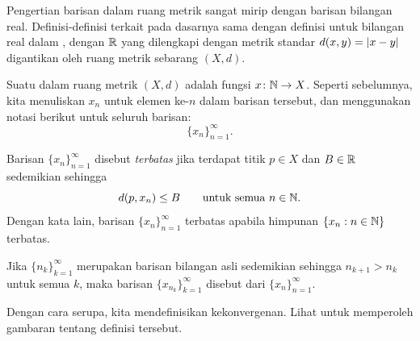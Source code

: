 Pengertian barisan dalam ruang metrik sangat mirip dengan barisan
bilangan real.
Definisi-definisi terkait pada dasarnya sama dengan definisi untuk bilangan real
dalam , dengan ${\mathbb{R}}$ yang dilengkapi
dengan metrik standar $d(x,y)=\lvert {x-y} \rvert$ digantikan
oleh ruang metrik sebarang $(X,d)$.


\begin{defn}
Suatu \emph{} dalam ruang metrik $(X,d)$ adalah fungsi
$x \colon {\mathbb{N}} \to X$.  Seperti sebelumnya, kita menuliskan $x_n$ untuk elemen ke-$n$ dalam
barisan tersebut, dan menggunakan notasi berikut untuk seluruh barisan:
\begin{equation*}
\{ x_n \}_{n=1}^\infty .
\end{equation*}

Barisan $\{ x_n \}_{n=1}^\infty$ disebut \emph{terbatas} jika
terdapat titik $p \in X$ dan $B \in {\mathbb{R}}$ sedemikian sehingga
\begin{equation*}
d(p,x_n) \leq B \qquad \text{untuk semua } n \in {\mathbb{N}}.
\end{equation*}
Dengan kata lain, barisan $\{x_n\}_{n=1}^\infty$ terbatas apabila
himpunan $\{ x_n : n \in {\mathbb{N}} \}$
terbatas.

Jika $\{ n_k \}_{k=1}^\infty$ merupakan barisan bilangan asli
sedemikian sehingga $n_{k+1} > n_k$ untuk semua $k$, maka
barisan $\{ x_{n_k} \}_{k=1}^\infty$
disebut
\emph{} dari $\{x_n \}_{n=1}^\infty$.
\end{defn}

Dengan cara serupa, kita mendefinisikan kekonvergenan.
Lihat  untuk memperoleh gambaran tentang
definisi tersebut.

